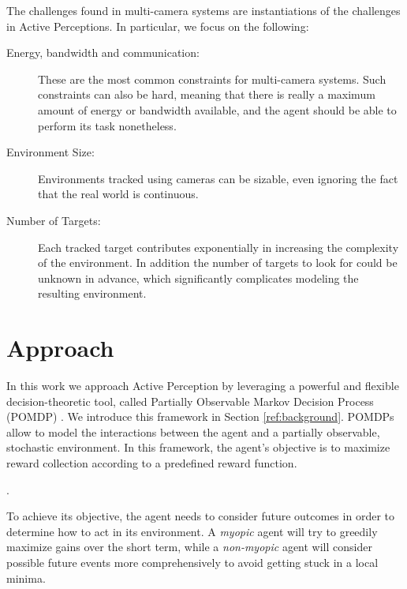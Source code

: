 The challenges found in multi-camera systems are instantiations of the challenges in Active
Perceptions. In particular, we focus on the following:

\begin{description}
\item[Energy, bandwidth and communication:] These are the most common constraints for multi-camera
    systems. Such constraints can also be hard, meaning that there is really a maximum amount of
    energy or bandwidth available, and the agent should be able to perform its task nonetheless.
\item[Environment Size:] Environments tracked using cameras can be sizable, even ignoring the fact
    that the real world is continuous.
\item[Number of Targets:] Each tracked target contributes exponentially in increasing the complexity
    of the environment. In addition the number of targets to look for could be unknown in advance,
    which significantly complicates modeling the resulting environment.
\end{description}

\section{Approach}


In this work we approach Active Perception by leveraging a powerful and flexible decision-theoretic
tool, called Partially Observable Markov Decision Process (POMDP) \cite{cit:pomdp}. We introduce
this framework in Section \ref{ref:background}. POMDPs allow to model the interactions between the
agent and a partially observable, stochastic environment.  In this framework, the agent's objective
is to maximize reward collection according to a predefined reward function.

. 

To achieve its objective, the agent needs to consider future outcomes in order to determine how to
act in its environment. A \textit{myopic} agent will try to greedily maximize gains over the short
term, while a \textit{non-myopic} agent will consider possible future events more comprehensively to
 avoid getting stuck in a local minima. 

